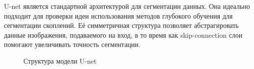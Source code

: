 U-net \cite{Unet} является стандартной архитектурой для сегментации данных. Она идеально подходит 
для проверки идеи использования методов глубокого обучения для сегментации скоплений.
Её симметричная структура позволяет абстрагировать данные изображения, подаваемого на 
вход, в то время как skip-connection слои помогают увеличивать точность сегментации.

\begin{figure}[h]
    \caption{Структура модели U-net \cite{Unet}}
\end{figure}


